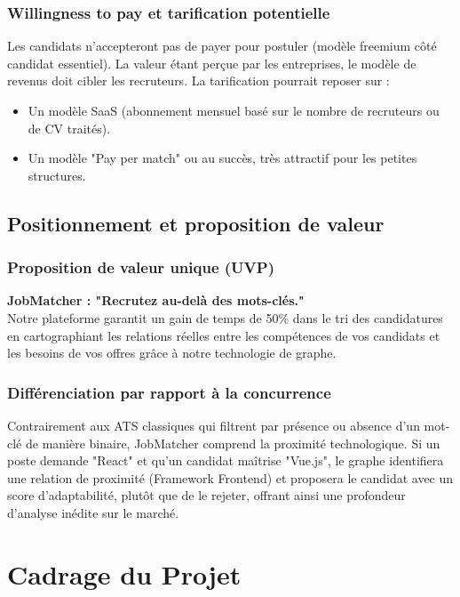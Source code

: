 \documentclass[12pt,a4paper]{report}
\begin{document}
\subsection{Willingness to pay et tarification potentielle}
Les candidats n'accepteront pas de payer pour postuler (modèle freemium côté candidat essentiel). La valeur étant perçue par les entreprises, le modèle de revenus doit cibler les recruteurs. La tarification pourrait reposer sur :
\begin{itemize}
    \item Un modèle SaaS (abonnement mensuel basé sur le nombre de recruteurs ou de CV traités).
    \item Un modèle "Pay per match" ou au succès, très attractif pour les petites structures.
\end{itemize}

\section{Positionnement et proposition de valeur}

\subsection{Proposition de valeur unique (UVP)}
\textbf{JobMatcher : "Recrutez au-delà des mots-clés."} \\
Notre plateforme garantit un gain de temps de 50\% dans le tri des candidatures en cartographiant les relations réelles entre les compétences de vos candidats et les besoins de vos offres grâce à notre technologie de graphe.

\subsection{Différenciation par rapport à la concurrence}
Contrairement aux ATS classiques qui filtrent par présence ou absence d'un mot-clé de manière binaire, JobMatcher comprend la proximité technologique. Si un poste demande "React" et qu'un candidat maîtrise "Vue.js", le graphe identifiera une relation de proximité (Framework Frontend) et proposera le candidat avec un score d'adaptabilité, plutôt que de le rejeter, offrant ainsi une profondeur d'analyse inédite sur le marché.

\chapter{Cadrage du Projet}
\end{document}
